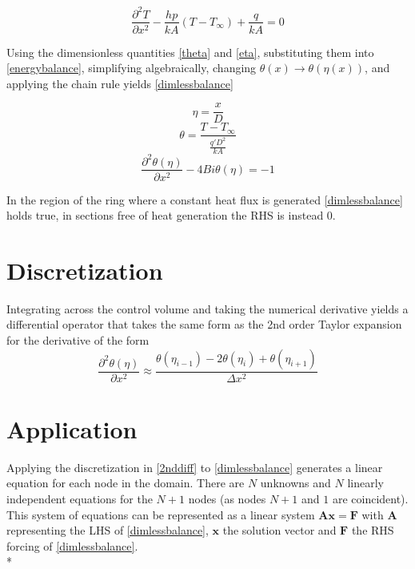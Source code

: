 \documentclass[letterpaper]{article}
\begin{document}
\begin{equation}\label{energybalance}
\frac{\partial^2 T}{\partial x^2} - \frac{hp}{kA}(T-T_\infty) + \frac{q}{kA} = 0
\end{equation}

Using the dimensionless quantities \eqref{theta} and \eqref{eta}, substituting them into \eqref{energybalance}, simplifying algebraically, changing \(\theta(x) \to \theta(\eta(x))\), and applying the chain rule yields \eqref{dimlessbalance}

\begin{equation}\label{eta}
\eta = \frac{x}{D}
\end{equation}
\begin{equation}\label{theta}
\theta = \frac{T-T_\infty}{\frac{q'D^2}{kA}}
\end{equation}
\begin{equation}\label{dimlessbalance}
\frac{\partial^2 \theta(\eta)}{\partial x^2} - 4Bi\theta(\eta) = -1
\end{equation}

In the region of the ring where a constant heat flux is generated \eqref{dimlessbalance} holds true, in sections free of heat generation the RHS is instead 0.

\section{Discretization}
Integrating across the control volume and taking the numerical derivative yields a differential operator that takes the same form as the 2nd order Taylor expansion for the derivative of the form
\begin{equation}\label{2nddiff}
\frac{\partial^2 \theta(\eta)}{\partial x^2} \approx \frac{\theta(\eta_{i-1})-2\theta(\eta_i)+\theta(\eta_{i+1})}{\Delta x^2}
\end{equation}

\section{Application}
Applying the discretization in \eqref{2nddiff} to \eqref{dimlessbalance} generates a linear equation for each node in the domain. There are $N$ unknowns and $N$ linearly independent equations for the $N+1$ nodes (as nodes $N+1$ and $1$ are coincident). This system of equations can be represented as a linear system $\mathbf{Ax=F}$ with $\mathbf{A}$ representing the LHS of \eqref{dimlessbalance}, $\mathbf{x}$ the solution vector and $\mathbf{F}$ the RHS forcing of \eqref{dimlessbalance}. \\*
\end{document}
